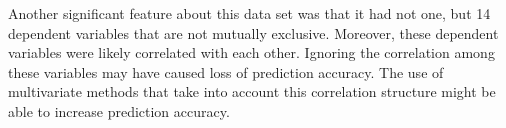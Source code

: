 \documentclass{article}\usepackage[]{graphicx}\usepackage[]{color}
\begin{document}
                                                                                                                                                                                                                                                                                                                                                                                                                                                                                                                                                                                                Another significant feature about this data set was that it had not one, but 14 dependent variables that are not mutually exclusive. Moreover, these dependent variables were likely correlated with each other. Ignoring the correlation among these variables may have caused loss of prediction accuracy. The use of multivariate methods that take into account this correlation structure might be able to increase prediction accuracy. 
                                                                                                                                                                                                                                                                                                                                                                                                                                                                                                                                                                                                
\end{document}
